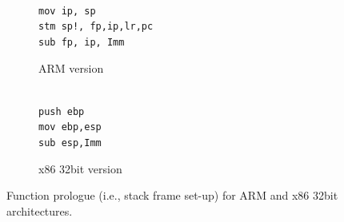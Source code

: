\begin{figure}[t]
\small
  \begin{subfigure}[b]{0.5\linewidth}
   \centering
    \raggedright{\texttt{
    \\
    	mov ip, sp\\
    	stm sp!, {fp,ip,lr,pc}\\
    	sub fp, ip, Imm\\
    }}
    \caption{\small{ARM version}}
   \label{fig:idiom2-ex-a}
    \vspace{1ex}
  \end{subfigure}%
   \begin{subfigure}[b]{0.5\linewidth}
   \centering
    \raggedright{\texttt{
    \\
    	push ebp\\
    	mov ebp,esp\\
    	sub esp,Imm\\
    }}
    \caption{\small{x86 32bit version}}
   \label{fig:idiom2-ex-b}
    \vspace{1ex}
  \end{subfigure}%
  \caption{Function prologue (i.e., stack frame set-up) for ARM and x86 32bit architectures.}
  \label{fig:idiom2-ex}
\end{figure}



